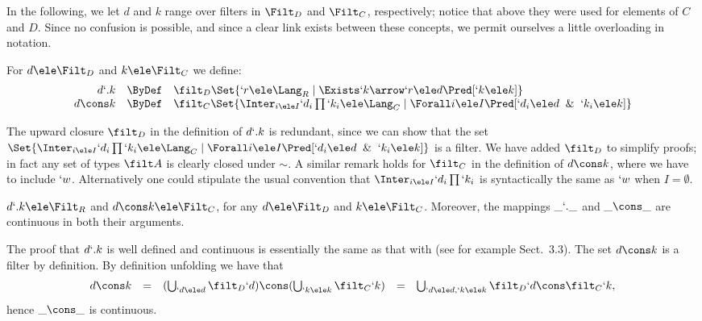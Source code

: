 \documentclass{CSML}
\begin{document}
In the following, we let $d$ and $k$ range over filters in $\Filt_D$ and $\Filt_C$, respectively; notice that above they were used for elements of $C$ and $D$. 
Since no confusion is possible, and since a clear link exists between these concepts, we permit ourselves a little overloading in notation.

 \begin{defi}
For $d \ele \Filt_D$ and $k \ele \Filt_C$ we define:
%
 \[ \begin{array}{rcl}
 d`.k &\ByDef& \filt_D\Set{`r \ele \Lang_R \mid \Exists `k\arrow `r \ele d \Pred[ `k \ele k ] } 
 	\\ %
 d\cons k &\ByDef& \filt_C\Set{\Inter_{i \ele I}`d_i\prod `k_i \ele \Lang_C \mid \Forall i \ele I \Pred[ `d_i \ele d \And `k_i \ele k ] }
 \end{array} \]
 \end{defi}

The upward closure $ \filt_D$ in the definition of $d`.k$ is redundant, since we can show that the set $\Set{\Inter_{i \ele I}`d_i\prod `k_i \ele \Lang_C \mid \Forall i \ele I \Pred[ `d_i \ele d \And `k_i \ele k ] }$ is a filter.
We have added $ \filt_D$ to simplify proofs; in fact any set of types $\filt A$ is clearly closed under $\sim$.
A similar remark holds for $\filt_C$ in the definition of $d\cons k$, where we have to include $`w$. Alternatively one could stipulate the usual convention that $\Inter_{i \ele I}`d_i\prod `k_i$ is syntactically the same as $`w$ when $I=\emptyset$.



 \begin{lem} \label{lem:appConsCont}
$d`.k \ele \Filt_R$ and $d\cons k \ele \Filt_C$, for any $d \ele \Filt_D$ and $k \ele \Filt_C$. 
Moreover, the mappings
$\_ `.\_$ and $\_ \cons \_$ are continuous in both their arguments.
 \end{lem}

 \begin{Proof} The proof that $d`.k$ is well defined and continuous is essentially the same as that with {\EATS} (see for example \cite{Amadio-Curien'98} Sect.~3.3).
The set $d\cons k$ is a filter by definition. By definition unfolding we have that 
%
 \[ \begin{array}{rcl@{\quad}lc}
d\cons k 
	&=& 
(\bigcup_{`d \ele d} \filt_D `d) \cons (\bigcup_{`k \ele k } \filt_C `k) 
	&=& 
\bigcup_{`d \ele d,`k \ele k } \filt_D `d \cons \filt_C `k,
 \end{array} \]
hence $\_ \cons \_$ is continuous.
 \end{Proof}
\end{document}
